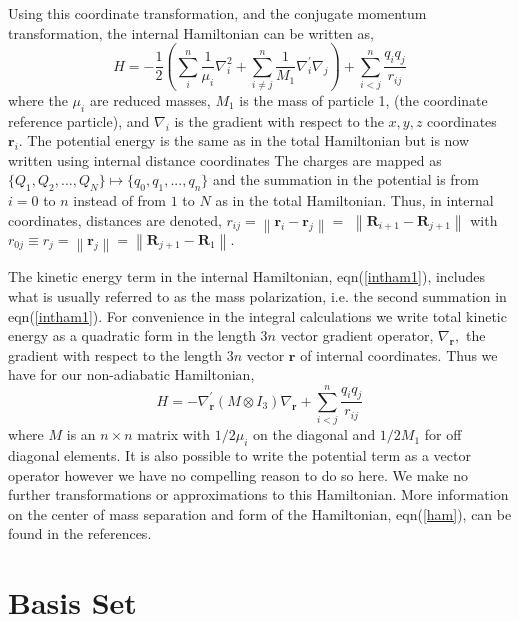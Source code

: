 \documentclass[12pt]{article}
\begin{document}
Using this coordinate transformation, and the conjugate momentum
transformation, the internal Hamiltonian can be written as,
\begin{equation}
H=-\frac{1}{2}\left(  \sum_{i}^{n}\frac{1}{\mu_{i}}\nabla_{i}^{2}+\sum_{i\neq
j}^{n}\frac{1}{M_{1}}\nabla_{i}^{\prime}\nabla_{j}\right)  +\sum_{i<j}%
^{n}\frac{q_{i}q_{j}}{r_{ij}}\label{intham1}%
\end{equation}
where the $\mu_{i}$ are reduced masses, $M_{1}$ is the mass of particle 1,
(the coordinate reference particle), and $\nabla_{i}$ is the gradient with
respect to the $x,y,z$ coordinates $\mathbf{r}_{i}$. The potential energy is
the same as in the total Hamiltonian but is now written using internal
distance coordinates The charges are mapped as $\{Q_{1},Q_{2},...,Q_{N}%
\}\mapsto\{q_{0},q_{1},...,q_{n}\}$ and the summation in the potential is from
$i=0$ to $n$ instead of from $1$ to $N$ as in the total Hamiltonian. Thus, in
internal coordinates, distances are denoted, $r_{ij}=\left\|  \mathbf{r}%
_{i}-\mathbf{r}_{j}\right\|  =$ $\left\|  \mathbf{R}_{i+1}-\mathbf{R}%
_{j+1}\right\|  \,\,$with\thinspace$r_{0j}\equiv r_{j}=\left\|  \mathbf{r}%
_{j}\right\|  =\left\|  \mathbf{R}_{j+1}-\mathbf{R}_{1}\right\|  .$

The kinetic energy term in the internal Hamiltonian, eqn(\ref{intham1}),
includes what is usually referred to as the mass polarization, i.e. the second
summation in eqn(\ref{intham1}). For convenience in the integral calculations
we write total kinetic energy as a quadratic form in the length $3n$ vector
gradient operator, $\nabla_{\mathbf{r}},$ the gradient with respect to the
length $3n$ vector $\mathbf{r}$ of internal coordinates. Thus we have for our
non-adiabatic Hamiltonian,
\begin{equation}
H=-\nabla_{\mathbf{r}}^{\prime}\left(  M\otimes I_{3}\right)  \nabla
_{\mathbf{r}}+\sum_{i<j}^{n}\frac{q_{i}q_{j}}{r_{ij}}\label{ham}%
\end{equation}
where $M$ is an $n\times n$ matrix with $1/2\mu_{i}$ on the diagonal and
$1/2M_{1}$ for off diagonal elements. It is also possible to write the
potential term as a vector operator\cite{Kinghorn95a} however we have no
compelling reason to do so here. We make no further transformations or
approximations to this Hamiltonian. More information on the center of mass
separation and form of the Hamiltonian, eqn(\ref{ham}), can be found in the
references\cite{Kinghorn93,Kinghorn95b}.\qquad\ 

\section{Basis Set}
\end{document}
